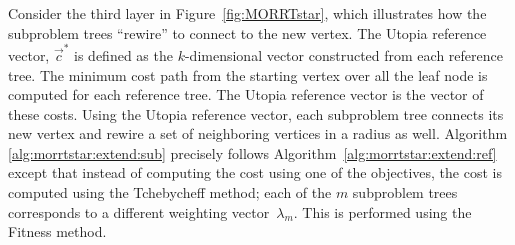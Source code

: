 \documentclass{article}
\begin{document}

Consider the third layer in Figure~\ref{fig:MORRTstar}, which illustrates how the subproblem trees ``rewire'' to connect to the new vertex.  
The Utopia reference vector, $\vec{c}^*$ is defined as the $k$-dimensional vector constructed from each reference tree.  
The minimum cost path from the starting vertex over all the leaf node is  computed for each reference tree.  
The Utopia reference vector is the vector of these costs. 
Using the Utopia reference vector, each subproblem tree connects its new vertex and rewire a set of neighboring vertices in a radius as well. 
Algorithm \ref{alg:morrtstar:extend:sub} precisely follows Algorithm~\ref{alg:morrtstar:extend:ref} except that instead of computing the cost using one of the objectives, the cost is computed using the Tchebycheff method; each of the $m$ subproblem trees corresponds to a different weighting vector~$\lambda_m$.  
This is performed using the {\sc Fitness} method.
\end{document}
